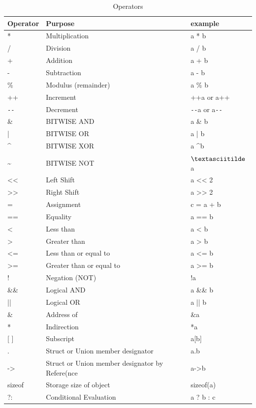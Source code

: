 \documentclass[../main.tex]{subfiles}
\begin{document}
	\begin{table}[h]
		\centering
		\begin{tabular}{l l l}
			\toprule
			\textbf{Operator} & \textbf{Purpose} & \textbf{example}\\
			\midrule
			* 	& Multiplication 	& a * b \\
			/ 	& Division 			& a / b \\
			+ 	& Addition 			& a + b \\
			- 	& Subtraction 		& a - b \\
			\% 	& Modulus (remainder) & a \% b \\
			++ 	& Increment 		& ++a or a++ \\
			\verb|--| & Decrement 	& \verb|--|a or a\verb|--| \\
			\& 	& BITWISE AND 		& a \& b \\
			| 	& BITWISE OR 		& a | b \\
			\textasciicircum 	& BITWISE XOR 		& a \textasciicircum b \\
			\textasciitilde 	& BITWISE NOT 		& $\textasciitilde$a \\
			<< 	& Left Shift 		& a << 2 \\
			>> 	& Right Shift 		& a >> 2 \\
			= 	& Assignment 		& c = a + b \\
			==	& Equality 			& a == b \\
			<	& Less than			& a < b \\
			>	& Greater than		& a > b \\
			<=	& Less than or equal to & a <= b \\
			>=	& Greater than or equal to & a >= b \\
			!	& Negation (NOT)	& !a \\
			\&\&& Logical AND		& a \&\& b \\
			|| 	& Logical OR		& a || b \\
			\&	& Address of		& \&a \\
			*	& Indirection		& *a \\
			{[ ]}	& Subscript		& a[b] \\
			.	& Struct or Union member designator & a.b \\
			->	& Struct or Union member designator by Refere(nce & a->b \\
			sizeof & Storage size of object & sizeof(a) \\
			?:	& Conditional Evaluation & a ? b : c \\
			\bottomrule
		\end{tabular}
		\caption{Operators}
		\label{tab:operators}
	\end{table}
\end{document}
